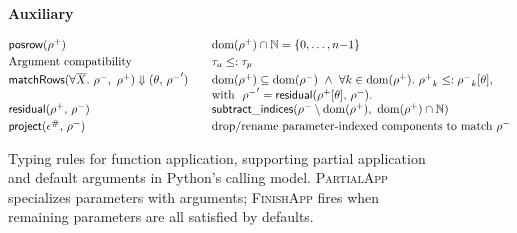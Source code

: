 \begin{figure}[t]
\centering
\begin{mathpar}



\end{mathpar}

\medskip
\textbf{Auxiliary}

\[
\begin{array}{@{}l@{\qquad}l@{}}
\mathsf{posrow}(\rpos)
  & \mathrm{dom}(\rpos)\cap\mathbb{N}=\{0,\dots,n{-}1\} \\[0.25em]
\text{Argument compatibility}
  & \tau_a \leq: \tau_p \\[0.25em]
\mathsf{matchRows}(\forall\overline{X}.~\rneg,~\rpos)\Downarrow(\theta,\,\rneg')
  &
  \begin{array}[t]{@{}l@{}}
  \mathrm{dom}(\rpos) \subseteq \mathrm{dom}(\rneg)\ \wedge
  \ \forall k\in\mathrm{dom}(\rpos).\ \rpos_k \leq: \rneg_k[\theta],\\
  \text{with }\ \rneg' = \mathsf{residual}(\rpos[\theta],\,\rneg).
  \end{array}
  \\[0.25em]
\mathsf{residual}(\rpos,\,\rneg)
  & \mathsf{subtract\_indices}(\rneg \setminus \mathrm{dom}(\rpos),\ \mathrm{dom}(\rpos)\cap\mathbb{N}) \\[0.25em]
\mathsf{project}(\epsilon^\#,\,\rneg)
  & \text{drop/rename parameter-indexed components to match }\rneg \\
\end{array}
\]

\caption{Typing rules for function application, supporting partial application and default arguments in Python’s calling model. \textsc{PartialApp} specializes parameters with arguments; \textsc{FinishApp} fires when remaining parameters are all satisfied by defaults.}
\label{fig:app-rules}
\end{figure}



